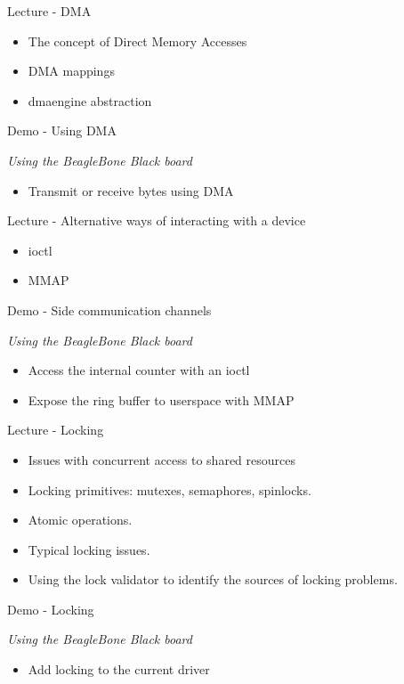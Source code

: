 \documentclass[a4paper,12pt,obeyspaces,spaces,hyphens]{article}
\begin{document}
\feagendatwocolumn
{Lecture - DMA}
{
  \begin{itemize}
  \item The concept of Direct Memory Accesses
  \item DMA mappings
  \item dmaengine abstraction
  \end{itemize}
}
{Demo - Using DMA}
{
  {\em Using the BeagleBone Black board}
  \begin{itemize}
  \item Transmit or receive bytes using DMA
  \end{itemize}
}

\feagendatwocolumn
{Lecture - Alternative ways of interacting with a device}
{
  \begin{itemize}
  \item ioctl
  \item MMAP
  \end{itemize}
}
{Demo - Side communication channels}
{
  {\em Using the BeagleBone Black board}
  \begin{itemize}
  \item Access the internal counter with an ioctl
  \item Expose the ring buffer to userspace with MMAP
  \end{itemize}
}

\feagendatwocolumn
{Lecture - Locking}
{
  \begin{itemize}
  \item Issues with concurrent access to shared resources
  \item Locking primitives: mutexes, semaphores, spinlocks.
  \item Atomic operations.
  \item Typical locking issues.
  \item Using the lock validator to identify the sources of locking
    problems.
  \end{itemize}
}
{Demo - Locking}
{
  {\em Using the BeagleBone Black board}
  \begin{itemize}
  \item Add locking to the current driver
  \end{itemize}
}
\end{document}

